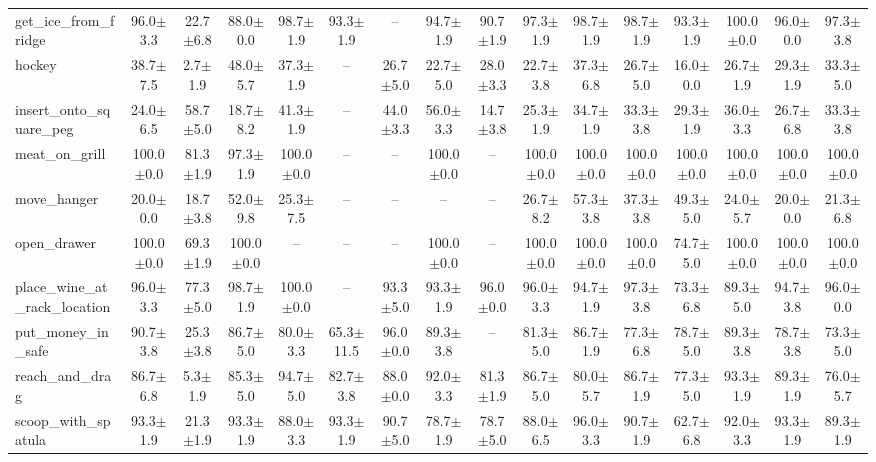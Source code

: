 \begin{table}[t]
{\begin{tabular}{l*{15}{c}}
get\_ice\_from\_fridge & 96.0$\pm$3.3 & 22.7$\pm$6.8 & 88.0$\pm$0.0 & 98.7$\pm$1.9 & 93.3$\pm$1.9 & -- & 94.7$\pm$1.9 & 90.7$\pm$1.9 & 97.3$\pm$1.9 & 98.7$\pm$1.9 & 98.7$\pm$1.9 & 93.3$\pm$1.9 & 100.0$\pm$0.0 & 96.0$\pm$0.0 & 97.3$\pm$3.8 \\
hockey & 38.7$\pm$7.5 & 2.7$\pm$1.9 & 48.0$\pm$5.7 & 37.3$\pm$1.9 & -- & 26.7$\pm$5.0 & 22.7$\pm$5.0 & 28.0$\pm$3.3 & 22.7$\pm$3.8 & 37.3$\pm$6.8 & 26.7$\pm$5.0 & 16.0$\pm$0.0 & 26.7$\pm$1.9 & 29.3$\pm$1.9 & 33.3$\pm$5.0 \\
insert\_onto\_square\_peg & 24.0$\pm$6.5 & 58.7$\pm$5.0 & 18.7$\pm$8.2 & 41.3$\pm$1.9 & -- & 44.0$\pm$3.3 & 56.0$\pm$3.3 & 14.7$\pm$3.8 & 25.3$\pm$1.9 & 34.7$\pm$1.9 & 33.3$\pm$3.8 & 29.3$\pm$1.9 & 36.0$\pm$3.3 & 26.7$\pm$6.8 & 33.3$\pm$3.8 \\
meat\_on\_grill & 100.0$\pm$0.0 & 81.3$\pm$1.9 & 97.3$\pm$1.9 & 100.0$\pm$0.0 & -- & -- & 100.0$\pm$0.0 & -- & 100.0$\pm$0.0 & 100.0$\pm$0.0 & 100.0$\pm$0.0 & 100.0$\pm$0.0 & 100.0$\pm$0.0 & 100.0$\pm$0.0 & 100.0$\pm$0.0 \\
move\_hanger & 20.0$\pm$0.0 & 18.7$\pm$3.8 & 52.0$\pm$9.8 & 25.3$\pm$7.5 & -- & -- & -- & -- & 26.7$\pm$8.2 & 57.3$\pm$3.8 & 37.3$\pm$3.8 & 49.3$\pm$5.0 & 24.0$\pm$5.7 & 20.0$\pm$0.0 & 21.3$\pm$6.8 \\
open\_drawer & 100.0$\pm$0.0 & 69.3$\pm$1.9 & 100.0$\pm$0.0 & -- & -- & -- & 100.0$\pm$0.0 & -- & 100.0$\pm$0.0 & 100.0$\pm$0.0 & 100.0$\pm$0.0 & 74.7$\pm$5.0 & 100.0$\pm$0.0 & 100.0$\pm$0.0 & 100.0$\pm$0.0 \\
place\_wine\_at\_rack\_location & 96.0$\pm$3.3 & 77.3$\pm$5.0 & 98.7$\pm$1.9 & 100.0$\pm$0.0 & -- & 93.3$\pm$5.0 & 93.3$\pm$1.9 & 96.0$\pm$0.0 & 96.0$\pm$3.3 & 94.7$\pm$1.9 & 97.3$\pm$3.8 & 73.3$\pm$6.8 & 89.3$\pm$5.0 & 94.7$\pm$3.8 & 96.0$\pm$0.0 \\
put\_money\_in\_safe & 90.7$\pm$3.8 & 25.3$\pm$3.8 & 86.7$\pm$5.0 & 80.0$\pm$3.3 & 65.3$\pm$11.5 & 96.0$\pm$0.0 & 89.3$\pm$3.8 & -- & 81.3$\pm$5.0 & 86.7$\pm$1.9 & 77.3$\pm$6.8 & 78.7$\pm$5.0 & 89.3$\pm$3.8 & 78.7$\pm$3.8 & 73.3$\pm$5.0 \\
reach\_and\_drag & 86.7$\pm$6.8 & 5.3$\pm$1.9 & 85.3$\pm$5.0 & 94.7$\pm$5.0 & 82.7$\pm$3.8 & 88.0$\pm$0.0 & 92.0$\pm$3.3 & 81.3$\pm$1.9 & 86.7$\pm$5.0 & 80.0$\pm$5.7 & 86.7$\pm$1.9 & 77.3$\pm$5.0 & 93.3$\pm$1.9 & 89.3$\pm$1.9 & 76.0$\pm$5.7 \\
scoop\_with\_spatula & 93.3$\pm$1.9 & 21.3$\pm$1.9 & 93.3$\pm$1.9 & 88.0$\pm$3.3 & 93.3$\pm$1.9 & 90.7$\pm$5.0 & 78.7$\pm$1.9 & 78.7$\pm$5.0 & 88.0$\pm$6.5 & 96.0$\pm$3.3 & 90.7$\pm$1.9 & 62.7$\pm$6.8 & 92.0$\pm$3.3 & 93.3$\pm$1.9 & 89.3$\pm$1.9 \\

\end{tabular}}
\end{table}
